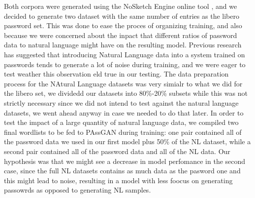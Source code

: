 Both corpora were generated using the NoSketch Engine online tool \cite{nosketch_engine}, and we decided to generate two dataset with the same number of entries as the libero password set. This was done to ease the proces of organizing training, and also because we were concerned about the inpact that different ratios of password data to natural language might have on the resulting model.
Previous research \cite{Melicher2016} has suggested that introducing Natural Language data into a system trained on passwords tends to generate a lot of noise during training, and we were eager to test weather this observation eld true in our testing.
The data preparation process for the NAtural Language datasets was very simialr to what we did for the libero set, we dividedd our datasets into 80\%-20\% subsets while this was not strictly necessary since we did not intend to test against the natural language datasets, we went ahead anyway in case we needed to do that later. In order to test the impact of a large quantity of natural language data, we compiled two final wordlists to be fed to PAssGAN during training: one pair contained all of the password data we used in our first model plus 50\% of the NL dataset, while a second pair contained all of the password data and all of the NL data. Our hypothesis was that we might see a decrease in model perfomance in the second case, since the full NL datasets contains as much data as the pasword one and this might lead to noise, resulting in a model with less foocus on generating passowrds as opposed to generating NL samples.   

